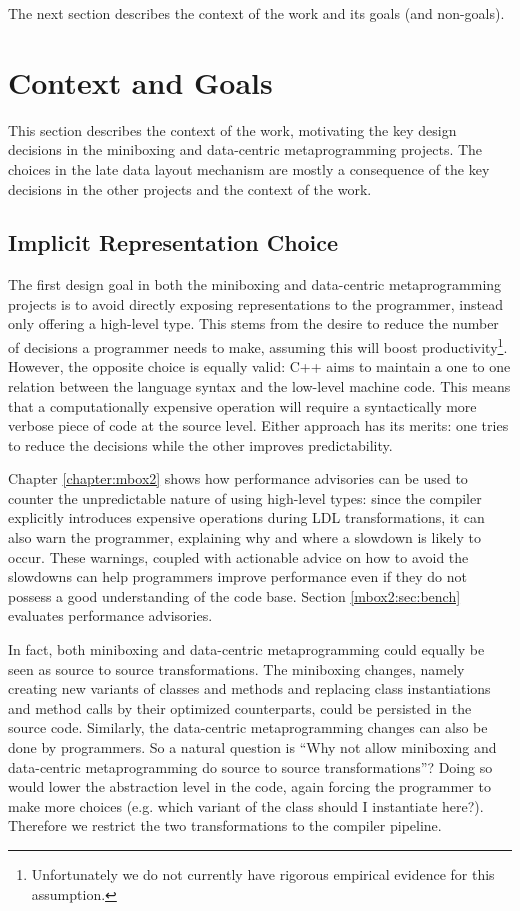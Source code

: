 The next section describes the context of the work and its goals (and non-goals).

\section{Context and Goals}

This section describes the context of the work, motivating the key design decisions in the miniboxing and data-centric metaprogramming projects. The choices in the late data layout mechanism are mostly a consequence of the key decisions in the other projects and the context of the work.

\subsection{Implicit Representation Choice}

The first design goal in both the miniboxing and data-centric metaprogramming projects is to avoid directly exposing representations to the programmer, instead only offering a high-level type. This stems from the desire to reduce the number of decisions a programmer needs to make, assuming this will boost productivity\footnote{Unfortunately we do not currently have rigorous empirical evidence for this assumption.}. However, the opposite choice is equally valid: C++ aims to maintain a one to one relation between the language syntax and the low-level machine code. This means that a computationally expensive operation will require a syntactically more verbose piece of code at the source level. Either approach has its merits: one tries to reduce the decisions while the other improves predictability.

Chapter \ref{chapter:mbox2} shows how performance advisories can be used to counter the unpredictable nature of using high-level types: since the compiler explicitly introduces expensive operations during LDL transformations, it can also warn the programmer, explaining why and where a slowdown is likely to occur. These warnings, coupled with actionable advice on how to avoid the slowdowns can help programmers improve performance even if they do not possess a good understanding of the code base. Section \ref{mbox2:sec:bench} evaluates performance advisories.

In fact, both miniboxing and data-centric metaprogramming could equally be seen as source to source transformations. The miniboxing changes, namely creating new variants of classes and methods and replacing class instantiations and method calls by their optimized counterparts, could be persisted in the source code. Similarly, the data-centric metaprogramming changes can also be done by programmers. So a natural question is ``Why not allow miniboxing and data-centric metaprogramming do source to source transformations''? Doing so would lower the abstraction level in the code, again forcing the programmer to make more choices (e.g. which variant of the class should I instantiate here?). Therefore we restrict the two transformations to the compiler pipeline.

